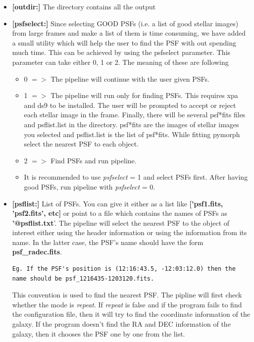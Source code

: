 \documentclass[a4paper,10pt]{article}
\newcommand{\red}[1]{{\color{red}[#1]}}
\begin{document}
\begin{itemize}
\item \textbf{\red{outdir:}} The directory contains all the output 

\item \textbf{\red{psfselect:}} Since selecting GOOD PSFs (i.e. a list of good stellar images) from large frames and make a list of them is time consuming, we have added a small utility which will help the user to find the PSF with out spending much time. This can be achieved by using the psfselect parameter. This parameter can take either 0, 1 or 2. The meaning of these are following
\begin{itemize}
\item 0 $=>$ The pipeline will continue with the user given PSFs.
\item 1 $=>$ The pipeline will run only for finding PSFs. This requires xpa and ds9 to be installed. The user will be prompted to accept or reject each stellar image in the frame. Finally, there will be several psf*fits files and psflist.list in the directory. psf*fits are the images of stellar images you selected and psflist.list is the list of psf*fits. While fitting pymorph select the nearest PSF to each object.
\item 2 $=>$ Find PSFs and run pipeline.
\item[] It is recommended to use \textit{psfselect} = 1 and select PSFs first. After having
 good PSFs, run pipeline with \textit{psfselect} = 0.
\end{itemize}

\item \textbf{\red{psflist:}} List of PSFs. You can give it either as a list like \textbf{['psf1.fits, 'psf2.fits', etc]} or point to a file which contains the names of PSFs as \textbf{'@psflist.txt}'. The pipeline will select the nearest PSF to the object of interest either using the header information or using the information from its name. In the latter case, the PSF's name should have the form \textbf{ psf\_radec.fits}.
\begin{verbatim}Eg. If the PSF's position is (12:16:43.5, -12:03:12.0) then the 
name should be psf_1216435-1203120.fits.
\end{verbatim}
This convention is used to find the nearest PSF. The pipline will first check whether the mode is \textit{repeat}. If \textit{repeat} is false and if the program fails to find the configuration file, then it will try to find the coordinate information of the galaxy. If the program doesn't find the RA and DEC information of the galaxy, then it chooses the PSF one by one from the list.


\end{itemize}
\end{document}
